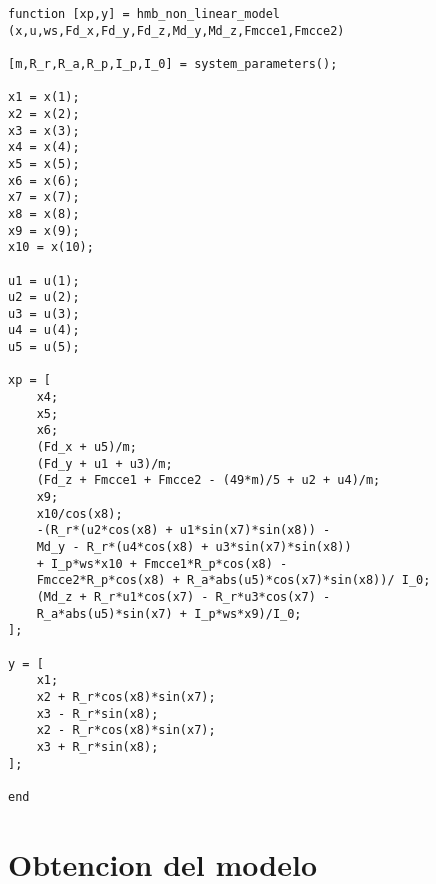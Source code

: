\begin{lstlisting}[frame=single]
function [xp,y] = hmb_non_linear_model
(x,u,ws,Fd_x,Fd_y,Fd_z,Md_y,Md_z,Fmcce1,Fmcce2)

[m,R_r,R_a,R_p,I_p,I_0] = system_parameters();

x1 = x(1);
x2 = x(2);
x3 = x(3);
x4 = x(4);
x5 = x(5);
x6 = x(6);
x7 = x(7);
x8 = x(8);
x9 = x(9);
x10 = x(10);

u1 = u(1);
u2 = u(2);
u3 = u(3);
u4 = u(4);
u5 = u(5);

xp = [
	x4;
	x5;
	x6;
	(Fd_x + u5)/m;
	(Fd_y + u1 + u3)/m;
	(Fd_z + Fmcce1 + Fmcce2 - (49*m)/5 + u2 + u4)/m;
	x9;
	x10/cos(x8);
	-(R_r*(u2*cos(x8) + u1*sin(x7)*sin(x8)) - 
	Md_y - R_r*(u4*cos(x8) + u3*sin(x7)*sin(x8))   	
	+ I_p*ws*x10 + Fmcce1*R_p*cos(x8) - 
	Fmcce2*R_p*cos(x8) + R_a*abs(u5)*cos(x7)*sin(x8))/ I_0;
	(Md_z + R_r*u1*cos(x7) - R_r*u3*cos(x7) - 
	R_a*abs(u5)*sin(x7) + I_p*ws*x9)/I_0;
];

y = [
	x1;
	x2 + R_r*cos(x8)*sin(x7);
	x3 - R_r*sin(x8);
	x2 - R_r*cos(x8)*sin(x7);
	x3 + R_r*sin(x8);
];

end

\end{lstlisting}

\section{Obtencion del modelo}


